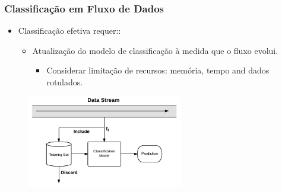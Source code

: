 \documentclass[14pt]{beamer}
\begin{document}








\begin{frame}\frametitle{Classificação em Fluxo de Dados}

\begin{itemize}
\item Classificação efetiva requer::
\begin{itemize}
\item Atualização do modelo de classificação à medida que o fluxo evolui.
\begin{itemize}
\item Considerar limitação de recursos: memória, tempo and dados rotulados.
\end{itemize}
\end{itemize}
\end{itemize}

\vspace{-0.2in}
\begin{figure}
\centering
\includegraphics[height=1.60in]{Stream2}
\end{figure}
\end{frame}
\end{document}
